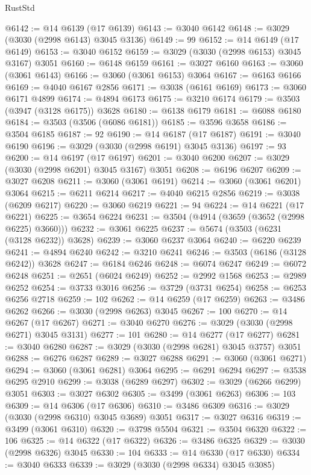 \begin{lexlean}{RustStd}
\begin{coremodule}
@6142 := @14 @6139 (@17 @6139)
@6143 := @3040 @6142
@6148 := @3029 (@3030 (@2998 @6143) @3045 @3136)
@6149 := 99
@6152 := @14 @6149 (@17 @6149)
@6153 := @3040 @6152
@6159 := @3029 (@3030 (@2998 @6153) @3045 @3167) @3051
@6160 := @6148 @6159
@6161 := @3027 @6160
@6163 := @3060 (@3061 @6143)
@6166 := @3060 (@3061 @6153) @3064
@6167 := @6163 @6166
@6169 := @4040 @6167 @2856
@6171 := @3038 (@6161 @6169)
@6173 := @3060 @6171 @4899
@6174 := @4894 @6173
@6175 := @3210 @6174
@6179 := @3503 (@3947 (@3128 @6175)) @3628
@6180 := @6138 @6179
@6181 := @6088 @6180
@6184 := @3503 (@3506 (@6086 @6181))
@6185 := @3596 @3658
@6186 := @3504 @6185
@6187 := 92
@6190 := @14 @6187 (@17 @6187)
@6191 := @3040 @6190
@6196 := @3029 (@3030 (@2998 @6191) @3045 @3136)
@6197 := 93
@6200 := @14 @6197 (@17 @6197)
@6201 := @3040 @6200
@6207 := @3029 (@3030 (@2998 @6201) @3045 @3167) @3051
@6208 := @6196 @6207
@6209 := @3027 @6208
@6211 := @3060 (@3061 @6191)
@6214 := @3060 (@3061 @6201) @3064
@6215 := @6211 @6214
@6217 := @4040 @6215 @2856
@6219 := @3038 (@6209 @6217)
@6220 := @3060 @6219
@6221 := 94
@6224 := @14 @6221 (@17 @6221)
@6225 := @3654 @6224
@6231 := @3504 (@4914 (@3659 (@3652 (@2998 @6225) @3660)))
@6232 := @3061 @6225
@6237 := @5674 (@3503 (@6231 (@3128 @6232)) @3628)
@6239 := @3060 @6237 @3064
@6240 := @6220 @6239
@6241 := @4894 @6240
@6242 := @3210 @6241
@6246 := @3503 (@6186 (@3128 @6242)) @3628
@6247 := @6184 @6246
@6248 := @6074 @6247
@6249 := @6072 @6248
@6251 := @2651 (@6024 @6249)
@6252 := @2992 @1568
@6253 := @2989 @6252
@6254 := @3733 @3016
@6256 := @3729 (@3731 @6254)
@6258 := @6253 @6256 @2718
@6259 := 102
@6262 := @14 @6259 (@17 @6259)
@6263 := @3486 @6262
@6266 := @3030 (@2998 @6263) @3045
@6267 := 100
@6270 := @14 @6267 (@17 @6267)
@6271 := @3040 @6270
@6276 := @3029 (@3030 (@2998 @6271) @3045 @3131)
@6277 := 101
@6280 := @14 @6277 (@17 @6277)
@6281 := @3040 @6280
@6287 := @3029 (@3030 (@2998 @6281) @3045 @3757) @3051
@6288 := @6276 @6287
@6289 := @3027 @6288
@6291 := @3060 (@3061 @6271)
@6294 := @3060 (@3061 @6281) @3064
@6295 := @6291 @6294
@6297 := @3538 @6295 @2910
@6299 := @3038 (@6289 @6297)
@6302 := @3029 (@6266 @6299) @3051
@6303 := @3027 @6302
@6305 := @3499 (@3061 @6263)
@6306 := 103
@6309 := @14 @6306 (@17 @6306)
@6310 := @3486 @6309
@6316 := @3029 (@3030 (@2998 @6310) @3045 @3689) @3051
@6317 := @3027 @6316
@6319 := @3499 (@3061 @6310)
@6320 := @3798 @5504
@6321 := @3504 @6320
@6322 := 106
@6325 := @14 @6322 (@17 @6322)
@6326 := @3486 @6325
@6329 := @3030 (@2998 @6326) @3045
@6330 := 104
@6333 := @14 @6330 (@17 @6330)
@6334 := @3040 @6333
@6339 := @3029 (@3030 (@2998 @6334) @3045 @3085)

\end{coremodule}
\end{lexlean}
